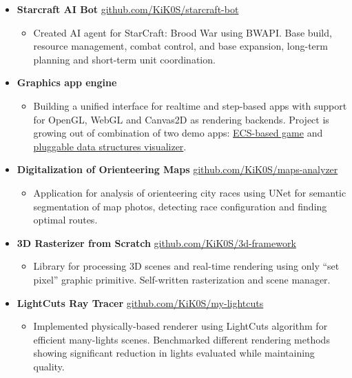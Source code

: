 \documentclass[paper=a4,fontsize=11pt]{scrartcl} %
\newcommand*\Hs{\ensuremath{\color{red}\varheartsuit}}
\newcommand{\heartstab}{%
}
\begin{document}
\begin{itemize}
    \item[\heartstab] \textbf{Starcraft AI Bot} \href{https://github.com/KiK0S/starcraft-bot}{github.com/KiK0S/starcraft-bot}
    \begin{itemize}
        \item Created AI agent for StarCraft: Brood War using BWAPI. Base build, resource management, combat control, and base expansion, long-term planning and short-term unit coordination.
    \end{itemize}

    \item[\heartstab] \textbf{Graphics app engine}
    \begin{itemize}
        \item Building a unified interface for realtime and step-based apps with support for OpenGL, WebGL and Canvas2D as rendering backends. Project is growing out of combination of two demo apps: \href{https://kik0s.github.io/grib-grab}{ECS-based game} and \href{https://kik0s.github.io/edulcni/}{pluggable data structures visualizer}.
    \end{itemize}
    
    \item[\heartstab] \textbf{Digitalization of Orienteering Maps} \href{https://github.com/KiK0S/maps-analyzer}{github.com/KiK0S/maps-analyzer}
    \begin{itemize}
        \item Application for analysis of orienteering city races using UNet for semantic segmentation of map photos, detecting race configuration and finding optimal routes.
    \end{itemize}
    
    \item[\heartstab] \textbf{3D Rasterizer from Scratch} \href{https://github.com/KiK0S/3d-framework}{github.com/KiK0S/3d-framework}
    \begin{itemize}
        \item Library for processing 3D scenes and real-time rendering using only ``set pixel'' graphic primitive. Self-written rasterization and scene manager.
    \end{itemize}
    
    \item[\heartstab] \textbf{LightCuts Ray Tracer} \href{https://github.com/KiK0S/my-lightcuts}{github.com/KiK0S/my-lightcuts}
    \begin{itemize}
        \item Implemented physically-based renderer using LightCuts algorithm for efficient many-lights scenes. Benchmarked different rendering methods showing significant reduction in lights evaluated while maintaining quality.
    \end{itemize}
    

\end{itemize}
\end{document}
